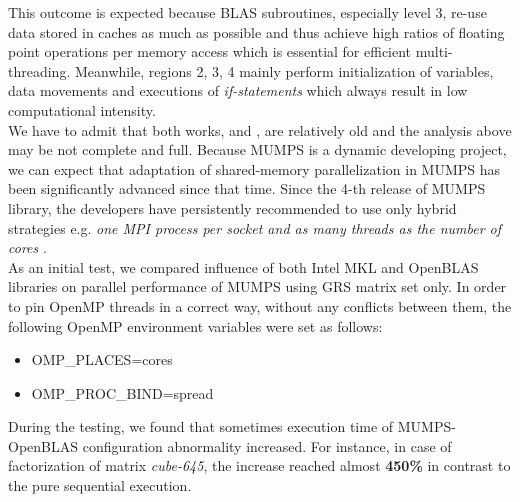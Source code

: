 This outcome is expected because BLAS subroutines, especially level 3, re-use data stored in caches as much as possible and thus achieve high ratios of floating point operations per memory access which is essential for efficient multi-threading. Meanwhile, regions 2, 3, 4 mainly perform initialization of variables, data movements and executions of \textit{if-statements} which always result in low computational intensity.\\



We have to admit that both works, \cite{chowdhury2010some} and \cite{l2013introduction}, are relatively old and the analysis above may be not complete and full. Because MUMPS is a dynamic developing project, we can expect that adaptation of shared-memory parallelization in MUMPS has been significantly advanced since that time. Since the 4-th release of MUMPS library, the developers have persistently recommended to use only hybrid strategies e.g. \textit{one MPI process per socket and as many threads as the number of cores} \cite{mumps-manual}.\\


As an initial test, we compared influence of both Intel MKL and OpenBLAS libraries on parallel performance of MUMPS using GRS matrix set only. In order to pin OpenMP threads in a correct way, without any conflicts between them, the following OpenMP environment variables were set as follows:

\begin{itemize}
	\item OMP\_PLACES=cores
	\item OMP\_PROC\_BIND=spread
\end{itemize} 


During the testing, we found that sometimes execution time of MUMPS-OpenBLAS configuration abnormality increased. For instance, in case of factorization of matrix \textit{cube-645}, the increase reached almost \textbf{450\%} in contrast to the pure sequential execution. \\

